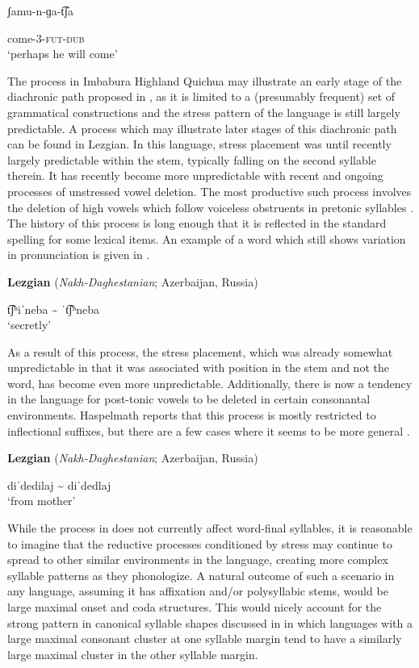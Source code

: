 ʃamu-n-ɡa-t͡ʃa

come-3-\textsc{fut-dub}\\
\glt ‘perhaps he will come’
\citep[209]{Cole1982}
\z

  The process in Imbabura Highland Quichua may illustrate an early stage of the diachronic path proposed in \citet{BybeeEtAl1998}, as it is limited to a (presumably frequent) set of grammatical constructions and the stress pattern of the language is still largely predictable. A process which may illustrate later stages of this diachronic path can be found in Lezgian. In this language, stress placement was until recently largely predictable within the stem, typically falling on the second syllable therein. It has recently become more unpredictable with recent and ongoing processes of unstressed vowel deletion. The most productive such process involves the deletion of high vowels which follow voiceless obstruents in pretonic syllables \citep[36]{Haspelmath1993}. The history of this process is long enough that it is reflected in the standard spelling for some lexical items. An example of a word which still shows variation in pronunciation is given in .

\ea\label{ex:5.2}
  \textbf{Lezgian} (\textit{Nakh-Daghestanian}; Azerbaijan, Russia)

t͡ʃʰiˈneba {\textasciitilde} ˈt͡ʃʰneba\\
\glt ‘secretly’
\citep[38]{Haspelmath1993}
\z

As a result of this process, the stress placement, which was already somewhat unpredictable in that it was associated with position in the stem and not the word, has become even more unpredictable. Additionally, there is now a tendency in the language for post-tonic vowels to be deleted in certain consonantal environments. Haspelmath reports that this process is mostly restricted to inflectional suffixes, but there are a few cases where it seems to be more general .

\ea\label{ex:5.3}
  \textbf{Lezgian} (\textit{Nakh-Daghestanian}; Azerbaijan, Russia)

diˈdedilaj {\textasciitilde} diˈdedlaj\\
\glt ‘from mother’
\citep[40]{Haspelmath1993}
\z

  While the process in  does not currently affect word-final syllables, it is reasonable to imagine that the reductive processes conditioned by stress may continue to spread to other similar environments in the language, creating more complex syllable patterns as they phonologize. A natural outcome of such a scenario in any language, assuming it has affixation and/or polysyllabic stems, would be large maximal onset and coda structures. This would nicely account for the strong pattern in canonical syllable shapes discussed in  in which languages with a large maximal consonant cluster at one syllable margin tend to have a similarly large maximal cluster in the other syllable margin.

